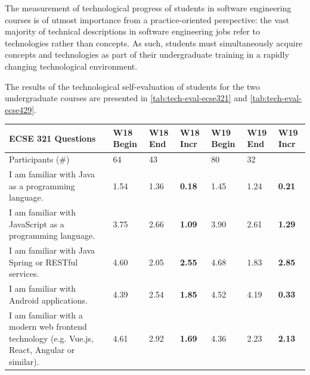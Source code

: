 \documentclass[a4paper,11pt]{article}
\begin{document}
The measurement of technological progress of students in software engineering courses is of utmost importance from a practice-oriented perspective: the vast majority of technical descriptions in software engineering jobs refer to technologies rather than concepts. As such, students must simultaneously acquire concepts and technologies as part of their undergraduate training in a rapidly changing technological environment. 

The results of the technological self-evaluation of students for the two undergraduate courses are presented in \autoref{tab:tech-eval-ecse321} and \autoref{tab:tech-eval-ecse429}.



\begin{table}[htb]
\footnotesize
\begin{tabular}{@{}p{8cm}p{1cm}p{1cm}p{1cm}p{1cm}p{1cm}p{1cm}@{}}
\toprule
\textbf{ECSE 321 Questions} & 
\textbf{W18} \newline \textbf{Begin} & 
\textbf{W18} \newline \textbf{End} & 
\textbf{W18} \newline \textbf{Incr} & 
\textbf{W19} \newline \textbf{Begin} & 
\textbf{W19} \newline \textbf{End} &
\textbf{W19} \newline \textbf{Incr} \\ \toprule
Participants (\#) & 64 & 43 &  & 80 & 32 &  \\ \midrule
I am familiar with Java as a programming language. & 1.54 & 1.36 & \textbf{0.18} & 1.45 & 1.24 & \textbf{0.21} \\ \midrule

I am familiar with JavaScript as a programming language. & 3.75 & 2.66 & \textbf{1.09} & 3.90 & 2.61 & \textbf{1.29} \\ \midrule

I am familiar with Java Spring or RESTful services. & 4.60 & 2.05 & \textbf{2.55} & 4.68 & 1.83 & \textbf{2.85}  \\ \midrule

I am familiar with Android applications. & 4.39 & 2.54 & \textbf{1.85} & 4.52 & 4.19 & \textbf{0.33}   \\ \midrule

I am familiar with a modern web frontend technology (e.g. Vue.js, React, Angular or similar). & 4.61 & 2.92 & \textbf{1.69} & 4.36 & 2.23 & \textbf{2.13}  \\ \midrule


\end{tabular}
\end{table}
\end{document}
